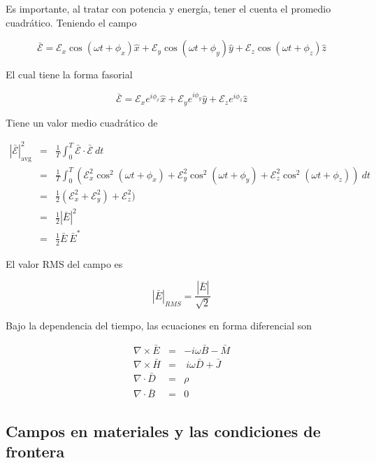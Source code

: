 Es importante, al tratar con potencia y energía, tener el cuenta el promedio cuadrático. Teniendo el campo

\begin{equation*}
\mathcal{\bar{E}} = \mathcal{E}_x \cos (\omega t + \phi_x) \hat{x} + \mathcal{E}_y \cos (\omega t + \phi_y) \hat{y} + \mathcal{E}_z \cos (\omega t + \phi_z) \hat{z}
\end{equation*}

El cual tiene la forma fasorial 

\begin{equation*}
\mathcal{\bar{E}} = \mathcal{E}_x e^{i \phi_x} \hat{x} + \mathcal{E}_y e^{i \phi_y} \hat{y} + \mathcal{E}_z e^{i \phi_z} \hat{z}
\end{equation*}

Tiene un valor medio cuadrático de 

\begin{eqnarray*}
|\mathcal{\bar{E}}|_{\text{avg}}^2 &=& \frac{1}{T} \int_0^T \mathcal{\bar{E}} \cdot \mathcal{\bar{E}} \ dt \\
&=& \frac{1}{T} \int_0^T \left(  \mathcal{E}_x^2 \cos^2 (\omega t + \phi_x) + \mathcal{E}_y^2 \cos^2 (\omega t + \phi_y) + \mathcal{E}_z^2 \cos^2 (\omega t + \phi_z) \right) \ dt \\ 
&=& \frac{1}{2} (\mathcal{E}_x^2 + \mathcal{E}_y^2) + \mathcal{E}_z^2)  \\
&=& \frac{1}{2} |\bar{E}|^2 \\
&=& \frac{1}{2} \bar{E} \ \bar{E}^*
\end{eqnarray*}

El valor RMS del campo es

\begin{equation*}
|\bar{E}|_{RMS} = \frac{|\bar{E}|}{\sqrt{2}}
\end{equation*}

Bajo la dependencia del tiempo, las ecuaciones en forma diferencial son

\begin{eqnarray*}
\nabla \times \bar{E} &=& - i \omega \bar{B} - \bar{M} \\
\nabla \times \bar{H} &=& \ i \omega \bar{D} + \bar{J} \\
\nabla \cdot \bar{D} &=& \rho \\
\nabla \cdot \bar{B} &=& 0
\end{eqnarray*}


\subsection{Campos en materiales y las condiciones de frontera}

